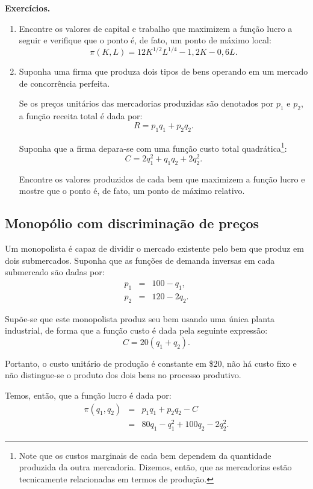 \documentclass[preprintnumbers,nofootinbib,amsmath,amssymb,12pt]{article}
\begin{document}
\noindent\textbf{Exercícios.}
\begin{enumerate}
    \item Encontre os valores de capital e trabalho que maximizem a função lucro a seguir e verifique que o ponto é, de fato, um ponto de máximo local:
    \[
    \pi(K,L) = 12K^{1/2}L^{1/4} - 1,2K - 0,6L.
    \]
    
    \item Suponha uma firma que produza dois tipos de bens operando em um mercado de concorrência perfeita.
    
    Se os preços unitários das mercadorias produzidas são denotados por $p_1$ e $p_2$, a função receita total é dada por:
    \[
    R = p_1q_1 + p_2q_2.
    \]
    
    Suponha que a firma depara-se com uma função custo total quadrática\footnote{Note que os custos marginais de cada bem dependem da quantidade produzida da outra mercadoria. Dizemos, então, que as mercadorias estão tecnicamente relacionadas em termos de produção.}:
    \[
    C = 2q_1^2 + q_1q_2 + 2q_2^2.
    \]
    
    Encontre os valores produzidos de cada bem que maximizem a função lucro e mostre que o ponto é, de fato, um ponto de máximo relativo.
\end{enumerate}

\newpage
\subsection{Monopólio com discriminação de preços}
Um monopolista é capaz de dividir o mercado existente pelo bem que produz em dois submercados. Suponha que as funções de demanda inversas em cada submercado são dadas por:
\begin{eqnarray}
p_1 &=& 100-q_1, \nonumber \\
p_2 &=& 120 - 2q_2. \nonumber
\end{eqnarray}

Supõe-se que este monopolista produz seu bem usando uma única planta industrial, de forma que a função custo é dada pela seguinte expressão:
\begin{equation}
    C = 20(q_1 + q_2).
    \nonumber
\end{equation}

Portanto, o custo unitário de produção é constante em \$20, não há custo fixo e não distingue-se o produto dos dois bens no processo produtivo.

Temos, então, que a função lucro é dada por:
\begin{eqnarray*}
\pi(q_1, q_2) &=& p_1q_1 + p_2q_2 - C \\
&=& 80q_1 - q_1^2 + 100q_2 - 2q_2^2.
\end{eqnarray*}
\end{document}
